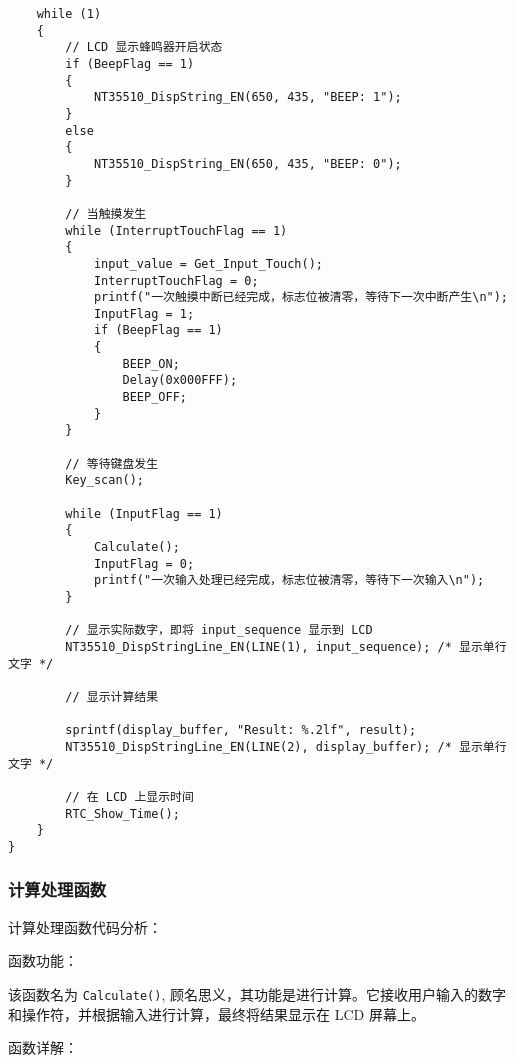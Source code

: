 \documentclass{theme-2639013-final}
\begin{document}
\begin{verbatim}
    while (1)
    {
        // LCD 显示蜂鸣器开启状态
        if (BeepFlag == 1)
        {
            NT35510_DispString_EN(650, 435, "BEEP: 1");
        }
        else
        {
            NT35510_DispString_EN(650, 435, "BEEP: 0");
        }

        // 当触摸发生
        while (InterruptTouchFlag == 1)
        {
            input_value = Get_Input_Touch();
            InterruptTouchFlag = 0;
            printf("一次触摸中断已经完成，标志位被清零，等待下一次中断产生\n");
            InputFlag = 1;
            if (BeepFlag == 1)
            {
                BEEP_ON;
                Delay(0x000FFF);
                BEEP_OFF;
            }
        }

        // 等待键盘发生
        Key_scan();

        while (InputFlag == 1)
        {
            Calculate();
            InputFlag = 0;
            printf("一次输入处理已经完成，标志位被清零，等待下一次输入\n");
        }

        // 显示实际数字，即将 input_sequence 显示到 LCD
        NT35510_DispStringLine_EN(LINE(1), input_sequence); /* 显示单行文字 */

        // 显示计算结果

        sprintf(display_buffer, "Result: %.2lf", result);
        NT35510_DispStringLine_EN(LINE(2), display_buffer); /* 显示单行文字 */

        // 在 LCD 上显示时间
        RTC_Show_Time();
    }
}
\end{verbatim}

\subsubsection{计算处理函数}

计算处理函数代码分析：

函数功能：

该函数名为 \texttt{Calculate()}, 顾名思义，其功能是进行计算。它接收用户输入的数字和操作符，并根据输入进行计算，最终将结果显示在 LCD 屏幕上。

函数详解：
\end{document}
